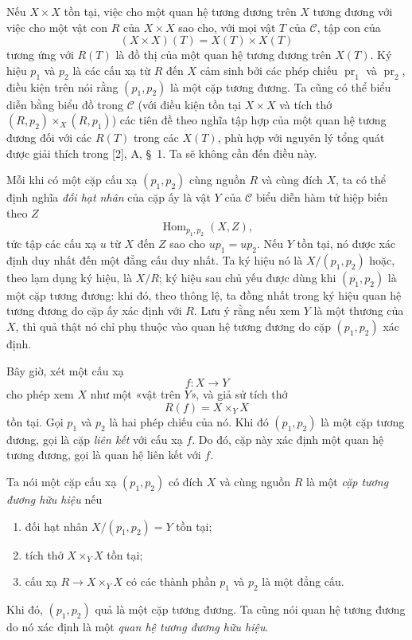 \documentclass[11pt,twoside,openany]{book}
\numberwithin{equation}{section}
\newcommand{\src}[1]{%
  \phantomsection\hypertarget{src:\fgasourceid:#1}{}%
  \marginpar{\raggedleft\footnotesize\sffamily #1}%
}
\newcommand{\fgasourceid}{unset}
\begin{document}
Nếu $X\times X$ tồn tại, việc cho một quan hệ tương đương trên $X$ tương
đương với việc cho một vật con $R$ của $X\times X$ sao cho, với mọi vật $T$
của $\mathcal C$, tập con của
\[
  (X\times X)(T)=X(T)\times X(T)
\]
tương ứng với $R(T)$ là đồ thị của một quan hệ tương đương trên $X(T)$. Ký
hiệu $p_1$ và $p_2$ là các cấu xạ từ $R$ đến $X$ cảm sinh bởi các phép chiếu
$\operatorname{pr}_1$ và $\operatorname{pr}_2$, điều kiện trên nói rằng
$(p_1,p_2)$ là một cặp tương đương. Ta cũng có thể biểu diễn bằng biểu đồ
trong $\mathcal C$ (với điều kiện tồn tại $X\times X$ và tích thớ
$(R,p_2)\times_X(R,p_1)$) các tiên đề theo nghĩa tập hợp của một quan hệ
tương đương đối với các $R(T)$ trong các $X(T)$, phù hợp với nguyên lý tổng
quát được giải thích trong [2], A, \S~1. Ta sẽ không cần đến điều này.

Mỗi khi có một cặp cấu xạ $(p_1,p_2)$ cùng nguồn $R$ và cùng đích $X$, ta có
thể định nghĩa \emph{đối hạt nhân} của cặp ấy là vật $Y$ của $\mathcal C$
biểu diễn hàm tử hiệp biến theo $Z$
\[
  \operatorname{Hom}_{p_1,p_2}(X,Z),
\]
tức tập các cấu xạ $u$ từ $X$ đến $Z$ sao cho $up_1=up_2$. Nếu $Y$ tồn tại,
nó được xác định duy nhất đến một đẳng cấu duy nhất. Ta ký hiệu nó là
$X/(p_1,p_2)$ hoặc, theo lạm dụng ký hiệu, là $X/R$; ký hiệu sau chủ yếu được
dùng khi
\src{101}$(p_1,p_2)$ là một cặp tương đương: khi đó, theo thông lệ, ta đồng
nhất trong ký hiệu quan hệ tương đương do cặp ấy xác định với $R$. Lưu ý rằng
nếu xem $Y$ là một thương của $X$, thì quả thật nó chỉ phụ thuộc vào quan hệ
tương đương do cặp $(p_1,p_2)$ xác định.

Bây giờ, xét một cấu xạ
\[
  f:X\longrightarrow Y
\]
cho phép xem $X$ như một «vật trên $Y$», và giả sử tích thớ
\[
  R(f)=X\times_Y X
\]
tồn tại. Gọi $p_1$ và $p_2$ là hai phép chiếu của nó. Khi đó $(p_1,p_2)$ là
một cặp tương đương, gọi là cặp \emph{liên kết} với cấu xạ $f$. Do đó, cặp
này xác định một quan hệ tương đương, gọi là quan hệ liên kết với $f$.

Ta nói một cặp cấu xạ $(p_1,p_2)$ có đích $X$ và cùng nguồn $R$ là một
\emph{cặp tương đương hữu hiệu} nếu
\begin{enumerate}
  \item[(i)] đối hạt nhân $X/(p_1,p_2)=Y$ tồn tại;
  \item[(ii)] tích thớ $X\times_Y X$ tồn tại;
  \item[(iii)] cấu xạ $R\longrightarrow X\times_Y X$ có các thành phần $p_1$ và
  $p_2$ là một đẳng cấu.
\end{enumerate}
Khi đó, $(p_1,p_2)$ quả là một cặp tương đương. Ta cũng nói quan hệ tương
đương do nó xác định là một \emph{quan hệ tương đương hữu hiệu}.
\end{document}
